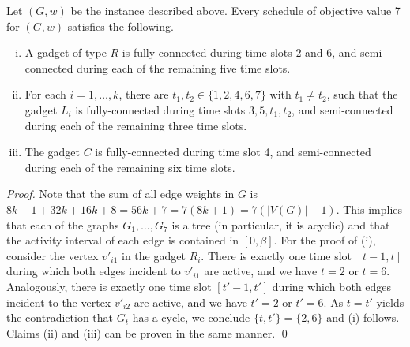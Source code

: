 \documentclass[runningheads]{llncs}
\newcommand{\set}[1]{\{ #1 \}}
\begin{document}
\begin{lemma}
\label{lemma:gadgets_properties}
Let $(G,w)$ be the instance described above. 
Every schedule of objective value 7 for $(G, w)$ satisfies the following.
\begin{enumerate}[(i)]
\item A gadget of type $R$ is fully-connected during time slots 2 and 6, and 
semi-connected during each of the remaining five time slots.
\item For each $i=1,\dots,k$, there are $t_1,t_2 \in \set{1,2,4,6,7}$ with $t_1\ne t_2$, such that the gadget $L_i$ is fully-connected during time slots $3,5,t_1, t_2$, 
and semi-connected during each of the remaining three time slots.
\item The gadget $C$ is fully-connected during time slot 4, 
and semi-connected during each of the remaining six time slots.
\end{enumerate}
\end{lemma}
\begin{proof}
Note that the sum of all edge weights in $G$ is $8k-1 +32k +16k +8 = 56k+7 = 7(8k + 1) = 7(|V(G)|-1)$. 
This implies that each of the graphs $G_1,\ldots,G_7$ is a tree (in particular, it is acyclic) and that the activity interval of each edge is contained in $[0, \beta]$.
For the proof of (i), consider the vertex $v'_{i1}$ in the gadget $R_i$. 
There is exactly one time slot $[t-1, t]$ during which both edges incident to $v'_{i1}$ are active, 
and we have $t=2$ or $t=6$. 
Analogously, there is exactly one time slot $[t'-1, t']$ during which both edges incident to 
the vertex $v'_{i2}$ are active, and we have $t' = 2$ or $t' = 6$. 
As $t=t'$ yields the contradiction that $G_t$ has a cycle, we conclude $\set{t,t'}=\set{2,6}$ and (i) follows. 
Claims (ii) and (iii) can be proven in the same manner. 
\qed
\end{proof}
\end{document}
